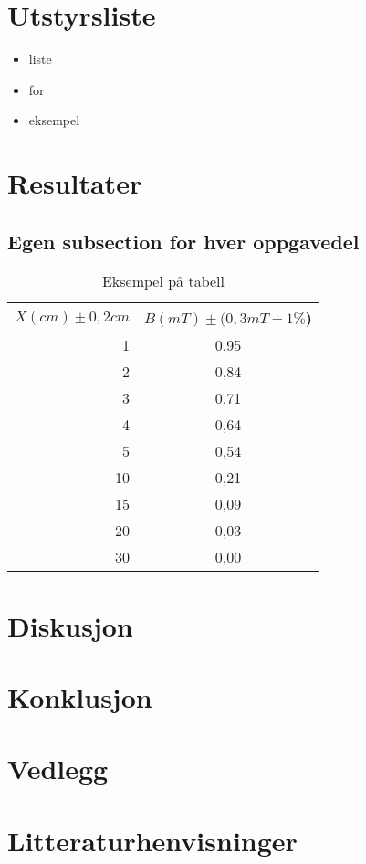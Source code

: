 \documentclass[12pt,norsk,a4paper]{article}
\begin{document}
\section{Utstyrsliste} 
    \begin{itemize} %
    \item liste     %
    \item for
    \item eksempel
    \end{itemize}
\clearpage


\section{Resultater}

\subsection{Egen subsection for hver oppgavedel}


\begin{table}[H] %
\begin{center}
	\begin{tabular}{ | r | c |} %
	\hline
	$X(cm )\pm0,2cm$  &$B(mT)\pm(0,3mT+1\%$) \\ \hline %
    1 & 0,95\\ \hline   %
    2 & 0,84\\ \hline
    3 & 0,71\\ \hline
    4 & 0,64\\ \hline
    5 & 0,54\\ \hline
    10 & 0,21\\ \hline
    15 & 0,09\\ \hline
    20 & 0,03\\ \hline
    30 & 0,00\\ \hline
    \hline
    \end{tabular}
    \end{center}
    \caption{Eksempel på tabell}

\end{table}
\clearpage

\section{Diskusjon}
\clearpage

\section{Konklusjon}
\clearpage

\section{Vedlegg}
\clearpage
\section{Litteraturhenvisninger}
\end{document}

